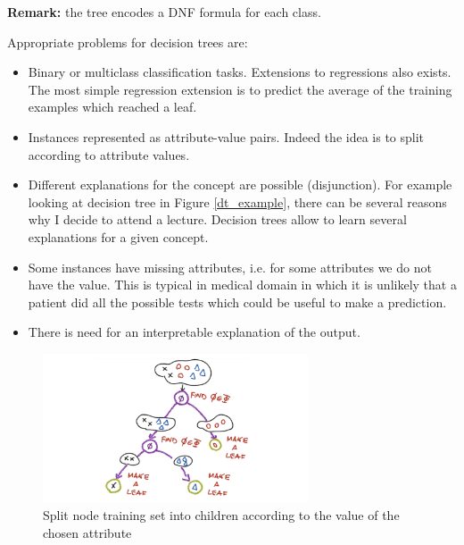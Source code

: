 \textbf{Remark:} the tree encodes a DNF formula for each class. \newline

Appropriate problems for decision trees are:
\begin{itemize}
    \item Binary or multiclass classification tasks. Extensions to regressions also exists. The most simple regression extension is to predict the average of the training examples which reached a leaf.
    \item Instances represented as attribute-value pairs. Indeed the idea is to split according to attribute values.
    \item Different explanations for the concept are possible (disjunction). For example looking at decision tree in Figure \ref{dt_example}, there can be several reasons why I decide to attend a lecture. Decision trees allow to learn several explanations for a given concept. 
    \item Some instances have missing attributes, i.e. for some attributes we do not have the value. This is typical in medical domain in which it is unlikely that a patient did all the possible tests which could be useful to make a prediction.
    \item There is need for an interpretable explanation of the output.
\end{itemize}

\begin{figure}[H]
    \centering
    \includegraphics[width=0.7\textwidth]{images/ricci_dt.png}
    \caption{Split node training set into children according to the value of the chosen attribute}
    \label{ricci_dt}
\end{figure}

